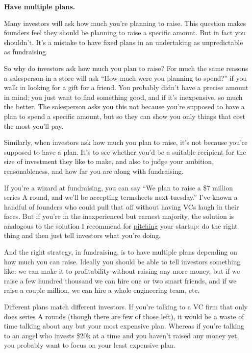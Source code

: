 \textbf{Have multiple plans.}

Many investors will ask how much you're planning to raise. This question
makes founders feel they should be planning to raise a specific amount.
But in fact you shouldn't. It's a mistake to have fixed plans in an
undertaking as unpredictable as fundraising.

So why do investors ask how much you plan to raise? For much the same
reasons a salesperson in a store will ask ``How much were you planning
to spend?'' if you walk in looking for a gift for a friend. You probably
didn't have a precise amount in mind; you just want to find something
good, and if it's inexpensive, so much the better. The salesperson asks
you this not because you're supposed to have a plan to spend a specific
amount, but so they can show you only things that cost the most you'll
pay.

Similarly, when investors ask how much you plan to raise, it's not
because you're supposed to have a plan. It's to see whether you'd be a
suitable recipient for the size of investment they like to make, and
also to judge your ambition, reasonableness, and how far you are along
with fundraising.

If you're a wizard at fundraising, you can say ``We plan to raise a \$7
million series A round, and we'll be accepting termsheets next
tuesday.'' I've known a handful of founders who could pull that off
without having VCs laugh in their faces. But if you're in the
inexperienced but earnest majority, the solution is analogous to the
solution I recommend for \href{convince.html}{pitching} your startup: do
the right thing and then just tell investors what you're doing.

And the right strategy, in fundraising, is to have multiple plans
depending on how much you can raise. Ideally you should be able to tell
investors something like: we can make it to profitability without
raising any more money, but if we raise a few hundred thousand we can
hire one or two smart friends, and if we raise a couple million, we can
hire a whole engineering team, etc.

Different plans match different investors. If you're talking to a VC
firm that only does series A rounds (though there are few of those
left), it would be a waste of time talking about any but your most
expensive plan. Whereas if you're talking to an angel who invests \$20k
at a time and you haven't raised any money yet, you probably want to
focus on your least expensive plan.

